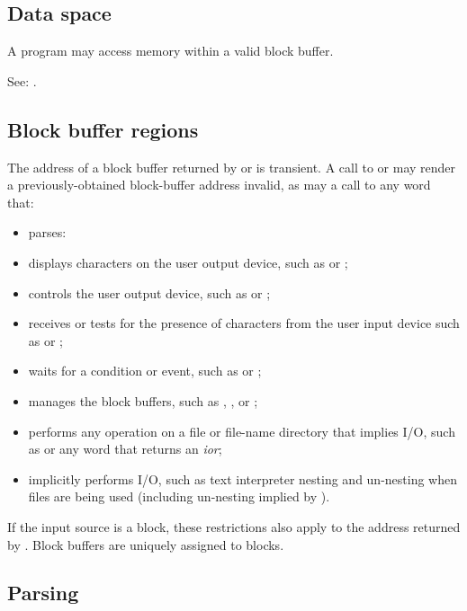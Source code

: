 \subsection{Data space} %

A program may access memory within a valid block buffer.

See: .

\subsection{Block buffer regions} %
\label{block:buffers}

The address of a block buffer returned by  or
 is transient. A call to  or 
may render a previously-obtained block-buffer address invalid, as
may a call to any word that:
\begin{itemize}
\item parses:
\item displays characters on the user output device, such as
	 or ;
\item controls the user output device, such as  or
	;
\item receives or tests for the presence of characters from the
	user input device such as  or
	;
\item waits for a condition or event, such as 
	or ;
\item manages the block buffers, such as ,
	, or ;
\item performs any operation on a file or file-name directory
	that implies I/O, such as  or any word that
	returns an \emph{ior};
\item implicitly performs I/O, such as text interpreter nesting
	and un-nesting when files are being used (including un-nesting
	implied by ).
\end{itemize}

If the input source is a block, these restrictions also apply to
the address returned by . Block buffers are
uniquely assigned to blocks.

\subsection{Parsing} %

